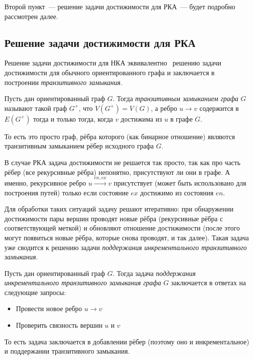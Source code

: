 Второй пункт~--- решение задачи достижимости для РКА~--- будет подробно рассмотрен далее.

\subsection{Решение задачи достижимости для РКА}

Решение задачи достижимости для НКА эквивалентно~\cite{Yannakakis1990} решению задачи достижимости для обычного ориентированного графа и заключается в построении \textit{транзитивного замыкания}.

\begin{definition}\label{def:TC}
  Пусть дан ориентированный граф $G$. Тогда \textit{транзитивным замыканием графа} $G$ называют такой граф $G^{+}$, что $V(G^{+}) = V(G)$, а ребро $u \to v$ содержится в $E(G^{+})$ тогда и только тогда, когда $v$ достижима из $u$ в графе $G$. 

  То есть это просто граф, рёбра которого (как бинарное отношение) являются транзитивным замыканием рёбер исходного графа $G$.
\end{definition}

В случае РКА задача достижимости не решается так просто, так как про часть рёбер (все рекурсивные рёбра) непонятно, присутствуют ли они в графе. А именно, рекурсивное ребро $u \xrightarrow{en, ex} v$ присутствует (может быть использовано для построения путей) только если состояние $ex$ достижимо из состояния $en$.

Для обработки таких ситуаций задачу решают итеративно: при обнаружении достижимости пары вершин проводят новые рёбра (рекурсивные рёбра с соответствующей меткой) и обновляют отношение достижимости (после этого могут появиться новые рёбра, которые снова проводят, и так далее). Такая задача уже сводится к решению задачи \textit{поддержания инкрементального транзитивного замыкания}.

\begin{definition}
  Пусть дан ориентированный граф $G$. Тогда задача \textit{поддержания инкрементального транзитивного замыкания графа} $G$ заключается в ответах на следующие запросы:
  \vspace{-\topsep}
  \begin{itemize}
    \setlength\itemsep{-0.1em}
    \item Провести новое ребро $u \to v$
    \item Проверить связность вершин $u$ и $v$
  \end{itemize}

  \vspace{-5pt}

  То есть задача заключается в добавлении рёбер (поэтому оно и инкрементальное) и поддержании транзитивного замыкания.
\end{definition}

